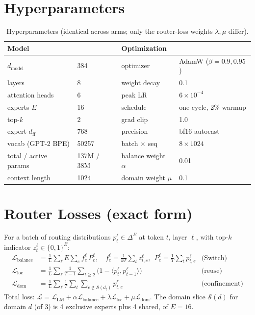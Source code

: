 \documentclass[11pt]{article}
\begin{document}
\section{Hyperparameters}
\label{app:hparams}
\begin{table}[h]\centering
\small
\begin{tabular}{ll@{\qquad}ll}
\toprule
Model & & Optimization & \\
\midrule
$d_{\text{model}}$ & 384 & optimizer & AdamW ($\beta{=}0.9,0.95$) \\
layers & 8 & weight decay & 0.1 \\
attention heads & 6 & peak LR & $6\times10^{-4}$ \\
experts $E$ & 16 & schedule & one-cycle, 2\% warmup \\
top-$k$ & 2 & grad clip & 1.0 \\
expert $d_{\text{ff}}$ & 768 & precision & bf16 autocast \\
vocab (GPT-2 BPE) & 50257 & batch $\times$ seq & $8\times1024$ \\
total / active params & 137M / 38M & balance weight $\alpha$ & 0.01 \\
context length & 1024 & domain weight $\mu$ & 0.1 \\
\bottomrule
\end{tabular}
\caption{Hyperparameters (identical across arms; only the router-loss weights
$\lambda,\mu$ differ).}
\label{tab:hparams}
\end{table}

\section{Router Losses (exact form)}
\label{app:losses}
For a batch of routing distributions $p_{t}^{\ell}\in\Delta^{E}$ at token $t$,
layer $\ell$, with top-$k$ indicator $z_{t}^{\ell}\in\{0,1\}^{E}$:
\begin{align*}
\mathcal{L}_{\text{balance}} &= \tfrac{1}{L}\sum_{\ell} E\sum_{e} f_e^{\ell}\,P_e^{\ell},
  \quad f_e^{\ell}=\tfrac{1}{kT}\!\sum_t z_{t,e}^{\ell},\ \ P_e^{\ell}=\tfrac{1}{T}\!\sum_t p_{t,e}^{\ell} & \text{(Switch)}\\
\mathcal{L}_{\text{loc}} &= \tfrac{1}{L}\sum_{\ell}\tfrac{1}{T-1}\sum_{t\ge2}\bigl(1-\langle p_t^{\ell},p_{t-1}^{\ell}\rangle\bigr) & \text{(reuse)}\\
\mathcal{L}_{\text{dom}} &= \tfrac{1}{L}\sum_{\ell}\tfrac{1}{T}\sum_t \sum_{e\notin\mathcal{S}(d_t)} p_{t,e}^{\ell} & \text{(confinement)}
\end{align*}
Total loss: $\mathcal{L}=\mathcal{L}_{\text{LM}}+\alpha\mathcal{L}_{\text{balance}}
+\lambda\mathcal{L}_{\text{loc}}+\mu\mathcal{L}_{\text{dom}}$. The domain slice
$\mathcal{S}(d)$ for domain $d$ (of 3) is 4 exclusive experts plus 4 shared, of
$E{=}16$.
\end{document}
